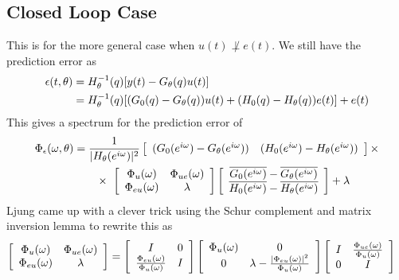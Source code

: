 \subsection{Closed Loop Case}
This is for the more general case when $u(t)\not\perp e(t)$.
We still have the prediction error as
\begin{align*}
\epsilon(t,\theta) &= H_\theta^{-1} (q)[y(t)-G_\theta(q) u(t)] \\
&= H_\theta^{-1} (q)[(G_0(q)-G_\theta(q))u(t)+(H_0(q)-H_\theta(q))e(t)]+e(t)
\end{align*}
This gives a spectrum for the prediction error of
\begin{align*}
\Phi_\eps(\w,\T) &= \frac{1}{|H_\T(e^{i\w})|^2}
\left[\begin{array}{c c} (G_0(e^{i\w})-G_\T(e^{i\w})) & (H_0(e^{i\w})-H_\T(e^{i\w})) \end{array}\right] \times\\
&\qquad\times~\left[\begin{array}{c c} \Phi_u(\w) & \Phi_{ue}(\w) \\ \Phi_{eu}(\w) & \lambda \end{array}\right]
\left[\begin{array}{c} \overline{G_0(e^{i\w})}-\overline{G_\T(e^{i\w})} \\ \overline{H_0(e^{i\w})}-\overline{H_\T(e^{i\w})} \end{array}\right] + \lambda%
\end{align*}
Ljung came up with a clever trick using the Schur complement and matrix inversion lemma to rewrite this as
\begin{align*}
\left[\begin{array}{c c} \Phi_u(\w) & \Phi_{ue}(\w) \\ \Phi_{eu}(\w) & \lambda \end{array}\right] &=
\left[\begin{array}{c c} I & 0 \\ \frac{\Phi_{eu}(\w)}{\Phi_u(\w)} & I \end{array}\right]
\left[\begin{array}{c c} \Phi_u(\w) & 0 \\ 0 & \lambda-\frac{|\Phi_{eu}(\w)|^2}{\Phi_u(\w)} \end{array}\right]%
\left[\begin{array}{c c} I & \frac{\Phi_{ue}(\w)}{\Phi_u(\w)} \\ 0 & I \end{array}\right]
\end{align*}

